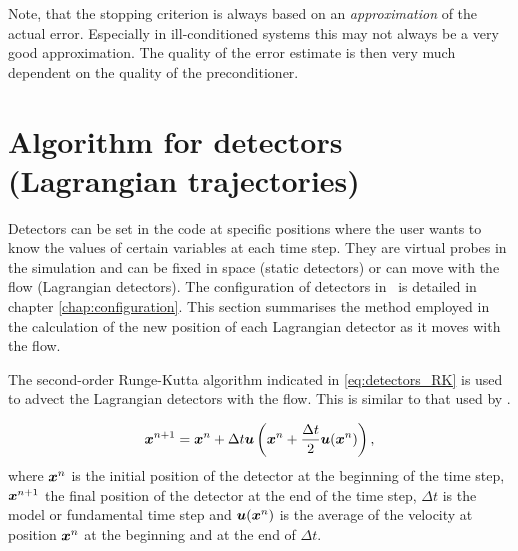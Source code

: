 Note, that the stopping criterion is always based on an \emph{approximation}
of the actual error. Especially in ill-conditioned systems this may not
always be a very good approximation. The quality of the error estimate is 
then very much dependent on the quality of the preconditioner.

\section{Algorithm for detectors (Lagrangian trajectories)}
  
Detectors can be set in the code at specific positions where the user wants
to know the values of certain variables at each time step. They are virtual
probes in the simulation and can be fixed in space (static detectors) or can
move with the flow (Lagrangian detectors). The configuration of detectors in
\fluidity\ is detailed in chapter
\ref{chap:configuration}. This section summarises the method
employed in the calculation of the new position of each Lagrangian detector
as it moves with the flow. 

The second-order Runge-Kutta algorithm indicated in \eqref{eq:detectors_RK}
is used to advect the Lagrangian detectors with the flow. This is similar to
that used by \cite{walters2007}.


\begin{equation}\label{eq:detectors_RK}
{\mbox{\boldmath$x$}}^{n+1} =  {\mbox{\boldmath$x$}}^{n} + \Delta t {\mbox{\boldmath$u$}}\left({\mbox{\boldmath$x$}}^{n} + \frac{\Delta t }{2} {\mbox{\boldmath$u$}}({\mbox{\boldmath$x$}}^{n})\right),
\end{equation}
where ${\mbox{\boldmath$x$}}^{n}$ is the initial position of the detector at the beginning of the time step, ${\mbox{\boldmath$x$}}^{n+1}$ the final position of the detector at the end of the time step, $\Delta t$ is the model or fundamental time step and ${\mbox{\boldmath$u$}}({\mbox{\boldmath$x$}}^{n})$ is the average of the velocity at position ${\mbox{\boldmath$x$}}^{n}$ at the beginning and at the end of $\Delta t$. 

